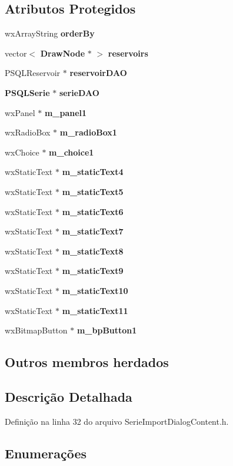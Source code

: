 \subsection*{Atributos Protegidos}
\begin{DoxyCompactItemize}
\item 
wx\+Array\+String {\bf order\+By}
\item 
vector$<$ {\bf Draw\+Node} $\ast$ $>$ {\bf reservoirs}
\item 
P\+S\+Q\+L\+Reservoir $\ast$ {\bf reservoir\+D\+AO}
\item 
{\bf P\+S\+Q\+L\+Serie} $\ast$ {\bf serie\+D\+AO}
\item 
wx\+Panel $\ast$ {\bf m\+\_\+panel1}
\item 
wx\+Radio\+Box $\ast$ {\bf m\+\_\+radio\+Box1}
\item 
wx\+Choice $\ast$ {\bf m\+\_\+choice1}
\item 
wx\+Static\+Text $\ast$ {\bf m\+\_\+static\+Text4}
\item 
wx\+Static\+Text $\ast$ {\bf m\+\_\+static\+Text5}
\item 
wx\+Static\+Text $\ast$ {\bf m\+\_\+static\+Text6}
\item 
wx\+Static\+Text $\ast$ {\bf m\+\_\+static\+Text7}
\item 
wx\+Static\+Text $\ast$ {\bf m\+\_\+static\+Text8}
\item 
wx\+Static\+Text $\ast$ {\bf m\+\_\+static\+Text9}
\item 
wx\+Static\+Text $\ast$ {\bf m\+\_\+static\+Text10}
\item 
wx\+Static\+Text $\ast$ {\bf m\+\_\+static\+Text11}
\item 
wx\+Bitmap\+Button $\ast$ {\bf m\+\_\+bp\+Button1}
\end{DoxyCompactItemize}
\subsection*{Outros membros herdados}


\subsection{Descrição Detalhada}


Definição na linha 32 do arquivo Serie\+Import\+Dialog\+Content.\+h.



\subsection{Enumerações}
